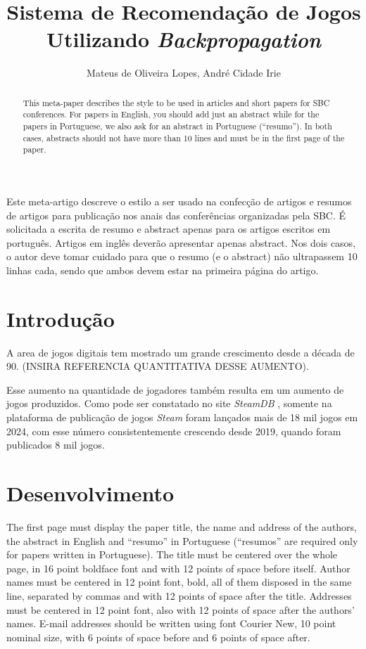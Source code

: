 \documentclass[12pt]{article}
\title{Sistema de Recomendação de Jogos Utilizando \textit{Backpropagation}}
\author{Mateus de Oliveira Lopes\inst{1}, André Cidade Irie\inst{1}}
\begin{document}
 

\maketitle

\begin{abstract}
  This meta-paper describes the style to be used in articles and short papers
  for SBC conferences. For papers in English, you should add just an abstract
  while for the papers in Portuguese, we also ask for an abstract in
  Portuguese (``resumo''). In both cases, abstracts should not have more than
  10 lines and must be in the first page of the paper.
\end{abstract}
     
\begin{resumo} 
  Este meta-artigo descreve o estilo a ser usado na confecção de artigos e
  resumos de artigos para publicação nos anais das conferências organizadas
  pela SBC. É solicitada a escrita de resumo e abstract apenas para os artigos
  escritos em português. Artigos em inglês deverão apresentar apenas abstract.
  Nos dois casos, o autor deve tomar cuidado para que o resumo (e o abstract)
  não ultrapassem 10 linhas cada, sendo que ambos devem estar na primeira
  página do artigo.
\end{resumo}


\section{Introdução}

A area de jogos digitais tem mostrado um grande crescimento desde a 
década de 90. (INSIRA REFERENCIA QUANTITATIVA DESSE AUMENTO).

Esse aumento na quantidade de jogadores também resulta em um aumento de
jogos produzidos. Como pode ser constatado no site \textit{SteamDB} \cite{steamdb}, somente
na plataforma de publicação de jogos \textit{Steam} foram lançados mais de 
18 mil jogos em 2024, com esse número consistentemente crescendo desde 2019,
quando foram publicados 8 mil jogos.

\section{Desenvolvimento} \label{sec:firstpage}

The first page must display the paper title, the name and address of the
authors, the abstract in English and ``resumo'' in Portuguese (``resumos'' are
required only for papers written in Portuguese). The title must be centered
over the whole page, in 16 point boldface font and with 12 points of space
before itself. Author names must be centered in 12 point font, bold, all of
them disposed in the same line, separated by commas and with 12 points of
space after the title. Addresses must be centered in 12 point font, also with
12 points of space after the authors' names. E-mail addresses should be
written using font Courier New, 10 point nominal size, with 6 points of space
before and 6 points of space after.
\end{document}
